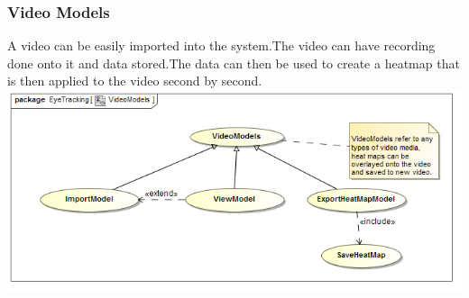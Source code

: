 	\subsubsection{Video Models}
	A video can be easily imported into the system.The video can have recording done onto it and data stored.The data can then be used to create a heatmap that is then applied to the video second by second.
	\newline
		\includegraphics[scale=0.5]{Diagrams/Use_Case_Diagram__VideoModels.png}
		
